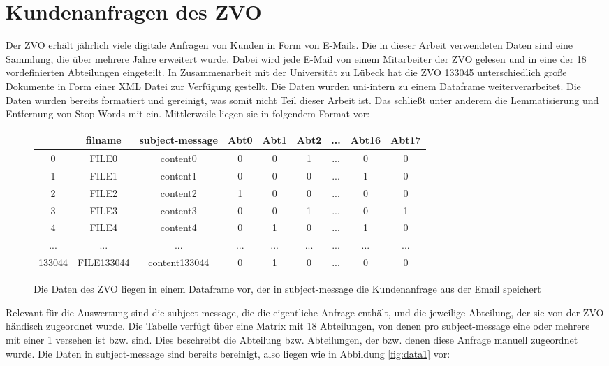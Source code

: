 \documentclass[german,version-2020-11]{uzl-thesis}
\begin{document}
\section{Kundenanfragen des ZVO}
Der ZVO erhält jährlich viele digitale Anfragen von Kunden in Form von E-Mails. Die in dieser Arbeit verwendeten Daten sind eine Sammlung, die über mehrere Jahre erweitert wurde. Dabei wird jede E-Mail von einem Mitarbeiter der ZVO gelesen und in eine der 18 vordefinierten Abteilungen eingeteilt. In Zusammenarbeit mit der Universität zu Lübeck hat die ZVO 133045 unterschiedlich große Dokumente in Form einer XML Datei zur Verfügung gestellt. Die Daten wurden uni-intern zu einem Dataframe weiterverarbeitet. Die Daten wurden bereits formatiert und gereinigt, was somit nicht Teil dieser Arbeit ist. Das schließt unter anderem die Lemmatisierung und Entfernung von Stop-Words mit ein. Mittlerweile liegen sie in folgendem Format vor: 

\begin{figure}[h]
\begin{center}
\begin{tabular}{ccccccccc}
\hline
\hline
& filname & subject-message & Abt0 & Abt1 & Abt2 &  ... & Abt16 & Abt17\\
\hline
0 & FILE0& content0 &0&0&1&...&0&0\\
1& FILE1 & content1 &0 &0 &0 &... &1&0\\
2& FILE2 & content2 & 1 &0 &0 &...&0 &0 \\
3& FILE3 & content3 & 0 & 0 &1 &...&0 &1 \\
4& FILE4 & content4 & 0 & 1 &0 &...&1 &0 \\
...& ... & ... & ... & ...  &... &... &... & ... \\
133044& FILE133044 & content133044 & 0 &1 & 0&...&0&0\\
\hline
\hline
\end{tabular}
\caption{Die Daten des ZVO liegen in einem Dataframe vor, der in subject-message die Kundenanfrage aus der Email speichert} 
\end{center}
\end{figure}

Relevant für die Auswertung sind die subject-message, die die eigentliche Anfrage enthält, und die jeweilige Abteilung, der sie von der ZVO händisch zugeordnet wurde. Die Tabelle verfügt über eine Matrix mit 18 Abteilungen, von denen pro subject-message eine oder mehrere mit einer 1 versehen ist bzw. sind. Dies beschreibt die Abteilung bzw. Abteilungen, der bzw. denen diese Anfrage manuell zugeordnet wurde. Die Daten in subject-message sind bereits bereinigt, also liegen wie in Abbildung \ref{fig:data1} vor:\\
\end{document}
